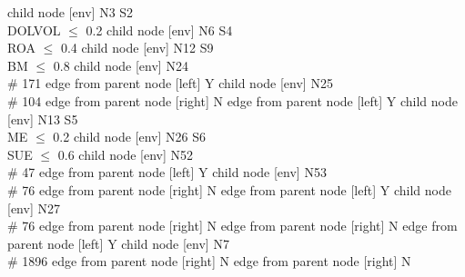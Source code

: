       child { node [env] {N3  S2 \\ DOLVOL $\leq$ 0.2} 
            child { node [env] {N6  S4 \\ ROA $\leq$ 0.4} 
                  child { node [env] {N12  S9 \\ BM $\leq$ 0.8} 
                        child { node [env] {N24   \\ \# 171 } 
                              edge from parent node [left] {Y} 
                        }
                        child { node [env] {N25   \\ \# 104 } 
                              edge from parent node [right] {N} 
                        }
                        edge from parent node [left] {Y} 
                  }
                  child { node [env] {N13  S5 \\ ME $\leq$ 0.2} 
                        child { node [env] {N26  S6 \\ SUE $\leq$ 0.6} 
                              child { node [env] {N52   \\ \# 47 } 
                                    edge from parent node [left] {Y} 
                              }
                              child { node [env] {N53   \\ \# 76 } 
                                    edge from parent node [right] {N} 
                              }
                              edge from parent node [left] {Y} 
                        }
                        child { node [env] {N27   \\ \# 76 } 
                              edge from parent node [right] {N} 
                        }
                        edge from parent node [right] {N} 
                  }
                  edge from parent node [left] {Y} 
            }
            child { node [env] {N7   \\ \# 1896 } 
                  edge from parent node [right] {N} 
            }
            edge from parent node [right] {N} 
      }

